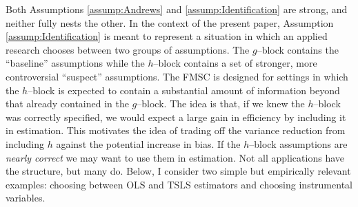 Both Assumptions \ref{assump:Andrews} and \ref{assump:Identification} are strong, and neither fully nests the other. 
In the context of the present paper, Assumption \ref{assump:Identification} is meant to represent a situation in which an applied research chooses between two groups of assumptions.
The $g$--block contains the ``baseline'' assumptions while the $h$--block contains a set of stronger, more controversial ``suspect'' assumptions.
The FMSC is designed for settings in which the $h$--block is expected to contain a substantial amount of information beyond that already contained in the $g$--block. 
The idea is that, if we knew the $h$--block was correctly specified, we would expect a large gain in efficiency by including it in estimation. 
This motivates the idea of trading off the variance reduction from including $h$ against the potential increase in bias.
If the $h$--block assumptions are \emph{nearly correct} we may want to use them in estimation.
Not all applications have the structure, but many do.
Below, I consider two simple but empirically relevant examples: choosing between OLS and TSLS estimators and choosing instrumental variables.
